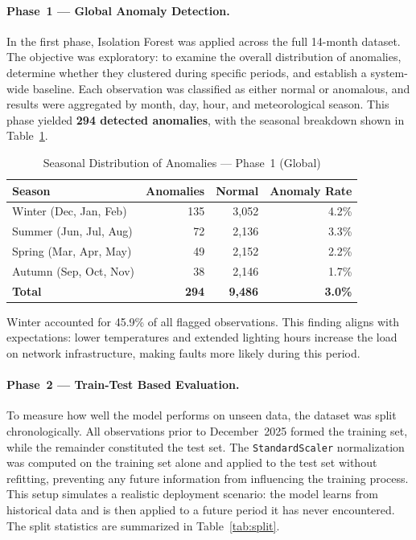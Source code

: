 \documentclass{article}
\begin{document}
\paragraph{Phase~1 --- Global Anomaly Detection.}
In the first phase, Isolation Forest was applied across the full 14-month dataset. The objective was exploratory: to examine the overall distribution of anomalies, determine whether they clustered during specific periods, and establish a system-wide baseline. Each observation was classified as either normal or anomalous, and results were aggregated by month, day, hour, and meteorological season. This phase yielded \textbf{294 detected anomalies}, with the seasonal breakdown shown in Table~\ref{tab:seasonal}.

\begin{table}[h]
\centering
\caption{Seasonal Distribution of Anomalies --- Phase~1 (Global)}
\label{tab:seasonal}
\begin{tabular}{lrrr}
\hline
\textbf{Season} & \textbf{Anomalies} & \textbf{Normal} & \textbf{Anomaly Rate} \\
\hline
Winter   (Dec, Jan, Feb) & 135 & 3{,}052 & 4.2\% \\
Summer   (Jun, Jul, Aug) &  72 & 2{,}136 & 3.3\% \\
Spring   (Mar, Apr, May) &  49 & 2{,}152 & 2.2\% \\
Autumn   (Sep, Oct, Nov) &  38 & 2{,}146 & 1.7\% \\
\hline
\textbf{Total} & \textbf{294} & \textbf{9{,}486} & \textbf{3.0\%} \\
\hline
\end{tabular}
\end{table}

Winter accounted for 45.9\% of all flagged observations. This finding aligns with expectations: lower temperatures and extended lighting hours increase the load on network infrastructure, making faults more likely during this period.

\paragraph{Phase~2 --- Train-Test Based Evaluation.}
To measure how well the model performs on unseen data, the dataset was split chronologically. All observations prior to December~2025 formed the training set, while the remainder constituted the test set. The \texttt{StandardScaler} normalization was computed on the training set alone and applied to the test set without refitting, preventing any future information from influencing the training process. This setup simulates a realistic deployment scenario: the model learns from historical data and is then applied to a future period it has never encountered. The split statistics are summarized in Table~\ref{tab:split}.
\end{document}
